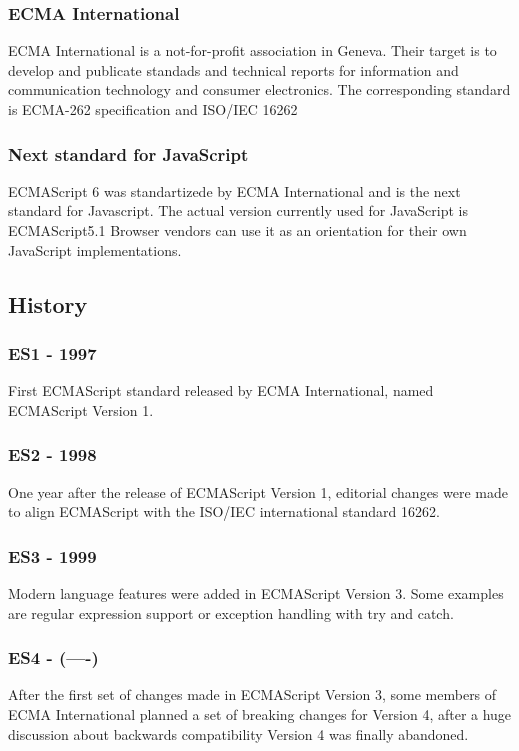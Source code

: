 \documentclass{bioinfo}
\begin{document}
\subsubsection{ECMA International}
ECMA International is a not-for-profit association in Geneva. Their target is
to develop and publicate standads and technical reports for information and
communication technology and consumer electronics. 
The corresponding standard is ECMA-262 specification and ISO/IEC 16262
\subsubsection{Next standard for JavaScript}
ECMAScript 6 was standartizede by ECMA International and is the next standard
for Javascript. The actual version currently used for JavaScript is ECMAScript5.1
Browser vendors can use it as an orientation for their own JavaScript implementations.

\subsection{History}
\subsubsection*{\textbf{ES1 - 1997}}
First ECMAScript standard released by ECMA International, named ECMAScript Version 1.
\subsubsection*{\textbf{ES2 - 1998}}
One year after the release of ECMAScript Version 1, editorial changes were made to align ECMAScript with the ISO/IEC international standard 16262.
\subsubsection*{\textbf{ES3 - 1999}}
Modern language features were added in ECMAScript Version 3. Some examples are regular expression support or exception handling with try and catch.
\subsubsection*{\textbf{ES4 - (----)}}After the first set of changes made in ECMAScript Version 3, some members of ECMA International planned a set of breaking changes for Version 4, after a huge discussion about backwards compatibility Version 4 was finally abandoned.
\end{document}
